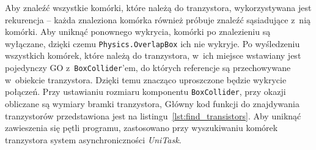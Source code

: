 Aby znaleźć wszystkie komórki, które należą do tranzystora, wykorzystywana jest rekurencja
-- każda znaleziona komórka również próbuje znaleźć sąsiadujące z~nią komórki.
Aby uniknąć ponownego wykrycia, komórki po znalezieniu są wyłączane,
dzięki czemu \texttt{Physics.OverlapBox} ich nie wykryje.
Po wyśledzeniu wszystkich komórek, które należą do tranzystora,
w~ich miejsce wstawiany jest pojedynczy GO z~\texttt{BoxCollider}'em,
do których referencje są przechowywane w~obiekcie tranzystora.
Dzięki temu znacząco uproszczone będzie wykrycie połączeń.
Przy ustawianiu rozmiaru komponentu \texttt{BoxCollider}, przy okazji obliczane są wymiary bramki tranzystora,
Główny kod funkcji do znajdywania tranzystorów przedstawiona jest na listingu~\ref{lst:find_transistors}.
Aby uniknąć zawieszenia się pętli programu,
zastosowano przy wyszukiwaniu komórek tranzystora system asynchroniczności \textit{UniTask}.\\


\\

